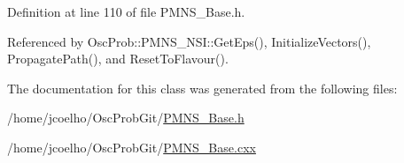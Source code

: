 Definition at line 110 of file P\+M\+N\+S\+\_\+\+Base.\+h.



Referenced by Osc\+Prob\+::\+P\+M\+N\+S\+\_\+\+N\+S\+I\+::\+Get\+Eps(), Initialize\+Vectors(), Propagate\+Path(), and Reset\+To\+Flavour().



The documentation for this class was generated from the following files\+:\begin{DoxyCompactItemize}
\item 
/home/jcoelho/\+Osc\+Prob\+Git/\hyperlink{PMNS__Base_8h}{P\+M\+N\+S\+\_\+\+Base.\+h}\item 
/home/jcoelho/\+Osc\+Prob\+Git/\hyperlink{PMNS__Base_8cxx}{P\+M\+N\+S\+\_\+\+Base.\+cxx}\end{DoxyCompactItemize}
